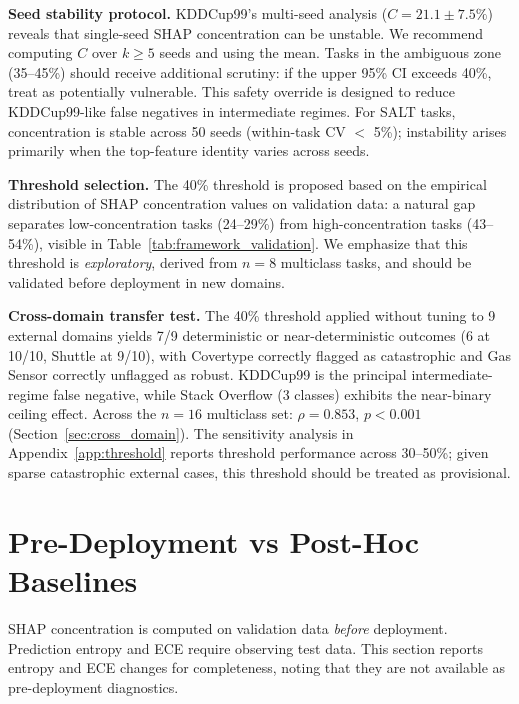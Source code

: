 \documentclass{uai2026} %
\begin{document}
\noindent\textbf{Seed stability protocol.} KDDCup99's multi-seed analysis ($C=21.1\pm7.5\%$) reveals that single-seed SHAP concentration can be unstable. We recommend computing $C$ over $k \geq 5$ seeds and using the mean. Tasks in the ambiguous zone (35--45\%) should receive additional scrutiny: if the upper 95\% CI exceeds 40\%, treat as potentially vulnerable. This safety override is designed to reduce KDDCup99-like false negatives in intermediate regimes. For SALT tasks, concentration is stable across 50 seeds (within-task CV $<$ 5\%); instability arises primarily when the top-feature identity varies across seeds.

\noindent\textbf{Threshold selection.} The 40\% threshold is proposed based on the empirical distribution of SHAP concentration values on validation data: a natural gap separates low-concentration tasks (24--29\%) from high-concentration tasks (43--54\%), visible in Table~\ref{tab:framework_validation}. We emphasize that this threshold is \textit{exploratory}, derived from $n=8$ multiclass tasks, and should be validated before deployment in new domains.

\noindent\textbf{Cross-domain transfer test.} The 40\% threshold applied without tuning to 9 external domains yields 7/9 deterministic or near-deterministic outcomes (6 at 10/10, Shuttle at 9/10), with Covertype correctly flagged as catastrophic and Gas Sensor correctly unflagged as robust. KDDCup99 is the principal intermediate-regime false negative, while Stack Overflow (3 classes) exhibits the near-binary ceiling effect. Across the $n=16$ multiclass set: $\rho = 0.853$, $p < 0.001$ (Section~\ref{sec:cross_domain}). The sensitivity analysis in Appendix~\ref{app:threshold} reports threshold performance across 30--50\%; given sparse catastrophic external cases, this threshold should be treated as provisional.

\section{Pre-Deployment vs Post-Hoc Baselines}\label{app:baselines}

SHAP concentration is computed on validation data \textit{before} deployment. Prediction entropy and ECE require observing test data. This section reports entropy and ECE changes for completeness, noting that they are not available as pre-deployment diagnostics.
\end{document}

